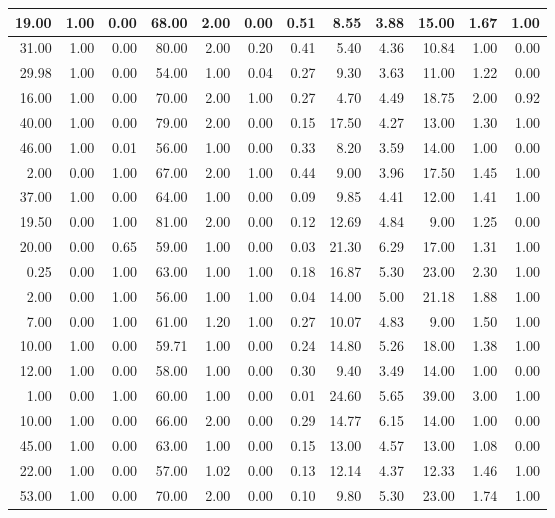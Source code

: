 \documentclass[
]{article}
\begin{document}
\begin{tabular}{r|r|r|r|r|r|r|r|r|r|r|r}
\hline
19.00 & 1.00 & 0.00 & 68.00 & 2.00 & 0.00 & 0.51 & 8.55 & 3.88 & 15.00 & 1.67 & 1.00\\
\hline
31.00 & 1.00 & 0.00 & 80.00 & 2.00 & 0.20 & 0.41 & 5.40 & 4.36 & 10.84 & 1.00 & 0.00\\
\hline
29.98 & 1.00 & 0.00 & 54.00 & 1.00 & 0.04 & 0.27 & 9.30 & 3.63 & 11.00 & 1.22 & 0.00\\
\hline
16.00 & 1.00 & 0.00 & 70.00 & 2.00 & 1.00 & 0.27 & 4.70 & 4.49 & 18.75 & 2.00 & 0.92\\
\hline
40.00 & 1.00 & 0.00 & 79.00 & 2.00 & 0.00 & 0.15 & 17.50 & 4.27 & 13.00 & 1.30 & 1.00\\
\hline
46.00 & 1.00 & 0.01 & 56.00 & 1.00 & 0.00 & 0.33 & 8.20 & 3.59 & 14.00 & 1.00 & 0.00\\
\hline
2.00 & 0.00 & 1.00 & 67.00 & 2.00 & 1.00 & 0.44 & 9.00 & 3.96 & 17.50 & 1.45 & 1.00\\
\hline
37.00 & 1.00 & 0.00 & 64.00 & 1.00 & 0.00 & 0.09 & 9.85 & 4.41 & 12.00 & 1.41 & 1.00\\
\hline
19.50 & 0.00 & 1.00 & 81.00 & 2.00 & 0.00 & 0.12 & 12.69 & 4.84 & 9.00 & 1.25 & 0.00\\
\hline
20.00 & 0.00 & 0.65 & 59.00 & 1.00 & 0.00 & 0.03 & 21.30 & 6.29 & 17.00 & 1.31 & 1.00\\
\hline
0.25 & 0.00 & 1.00 & 63.00 & 1.00 & 1.00 & 0.18 & 16.87 & 5.30 & 23.00 & 2.30 & 1.00\\
\hline
2.00 & 0.00 & 1.00 & 56.00 & 1.00 & 1.00 & 0.04 & 14.00 & 5.00 & 21.18 & 1.88 & 1.00\\
\hline
7.00 & 0.00 & 1.00 & 61.00 & 1.20 & 1.00 & 0.27 & 10.07 & 4.83 & 9.00 & 1.50 & 1.00\\
\hline
10.00 & 1.00 & 0.00 & 59.71 & 1.00 & 0.00 & 0.24 & 14.80 & 5.26 & 18.00 & 1.38 & 1.00\\
\hline
12.00 & 1.00 & 0.00 & 58.00 & 1.00 & 0.00 & 0.30 & 9.40 & 3.49 & 14.00 & 1.00 & 0.00\\
\hline
1.00 & 0.00 & 1.00 & 60.00 & 1.00 & 0.00 & 0.01 & 24.60 & 5.65 & 39.00 & 3.00 & 1.00\\
\hline
10.00 & 1.00 & 0.00 & 66.00 & 2.00 & 0.00 & 0.29 & 14.77 & 6.15 & 14.00 & 1.00 & 0.00\\
\hline
45.00 & 1.00 & 0.00 & 63.00 & 1.00 & 0.00 & 0.15 & 13.00 & 4.57 & 13.00 & 1.08 & 0.00\\
\hline
22.00 & 1.00 & 0.00 & 57.00 & 1.02 & 0.00 & 0.13 & 12.14 & 4.37 & 12.33 & 1.46 & 1.00\\
\hline
53.00 & 1.00 & 0.00 & 70.00 & 2.00 & 0.00 & 0.10 & 9.80 & 5.30 & 23.00 & 1.74 & 1.00\\

\end{tabular}
\end{document}
